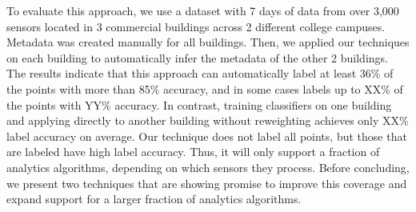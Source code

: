 To evaluate this approach, we use a dataset with 7 days of data from over 3,000
sensors located in 3 commercial buildings across 2 different college
campuses. Metadata was created manually for all buildings. Then, we applied our
techniques on each building to automatically infer the metadata of the other 2
buildings. The results indicate that this approach can automatically label at
least 36\% of the points with more than 85\% accuracy, and in some cases labels
up to XX\% of the points with YY\% accuracy. In contrast, training classifiers
on one building and applying directly to another building without reweighting
achieves only XX\% label accuracy on average. Our technique does not label all
points, but those that are labeled have high label accuracy. Thus, it will only
support a fraction of analytics algorithms, depending on which sensors they
process. Before concluding, we present two techniques that are showing promise
to improve this coverage and expand support for a larger fraction of analytics
algorithms.

